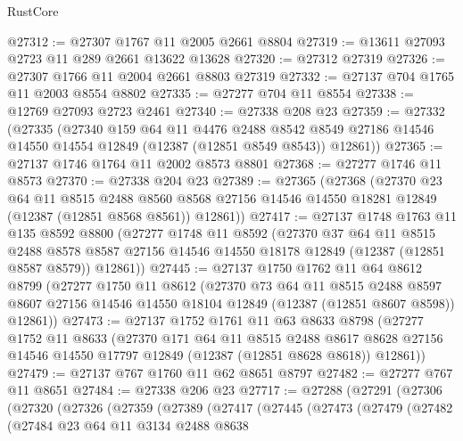 \begin{lexlean}{RustCore}
\begin{coremodule}
@27312 := @27307 @1767 @11 @2005 @2661 @8804
@27319 := @13611 @27093 @2723 @11 @289 @2661 @13622 @13628
@27320 := @27312 @27319
@27326 := @27307 @1766 @11 @2004 @2661 @8803 @27319
@27332 := @27137 @704 @1765 @11 @2003 @8554 @8802
@27335 := @27277 @704 @11 @8554
@27338 := @12769 @27093 @2723 @2461
@27340 := @27338 @208 @23
@27359 := @27332
    (@27335
      (@27340
        @159
        @64
        @11
        @4476
        @2488
        @8542
        @8549
        @27186
        @14546
        @14550
        @14554
        @12849
        (@12387 (@12851 @8549 @8543))
        @12861))
@27365 := @27137 @1746 @1764 @11 @2002 @8573 @8801
@27368 := @27277 @1746 @11 @8573
@27370 := @27338 @204 @23
@27389 := @27365
    (@27368
      (@27370
        @23
        @64
        @11
        @8515
        @2488
        @8560
        @8568
        @27156
        @14546
        @14550
        @18281
        @12849
        (@12387 (@12851 @8568 @8561))
        @12861))
@27417 := @27137
    @1748
    @1763
    @11
    @135
    @8592
    @8800
    (@27277
      @1748
      @11
      @8592
      (@27370
        @37
        @64
        @11
        @8515
        @2488
        @8578
        @8587
        @27156
        @14546
        @14550
        @18178
        @12849
        (@12387 (@12851 @8587 @8579))
        @12861))
@27445 := @27137
    @1750
    @1762
    @11
    @64
    @8612
    @8799
    (@27277
      @1750
      @11
      @8612
      (@27370
        @73
        @64
        @11
        @8515
        @2488
        @8597
        @8607
        @27156
        @14546
        @14550
        @18104
        @12849
        (@12387 (@12851 @8607 @8598))
        @12861))
@27473 := @27137
    @1752
    @1761
    @11
    @63
    @8633
    @8798
    (@27277
      @1752
      @11
      @8633
      (@27370
        @171
        @64
        @11
        @8515
        @2488
        @8617
        @8628
        @27156
        @14546
        @14550
        @17797
        @12849
        (@12387 (@12851 @8628 @8618))
        @12861))
@27479 := @27137 @767 @1760 @11 @62 @8651 @8797
@27482 := @27277 @767 @11 @8651
@27484 := @27338 @206 @23
@27717 := @27288
    (@27291
      (@27306
        (@27320
          (@27326
            (@27359
              (@27389
                (@27417
                  (@27445
                    (@27473
                      (@27479
                        (@27482
                          (@27484
                            @23
                            @64
                            @11
                            @3134
                            @2488
                            @8638

\end{coremodule}
\end{lexlean}
